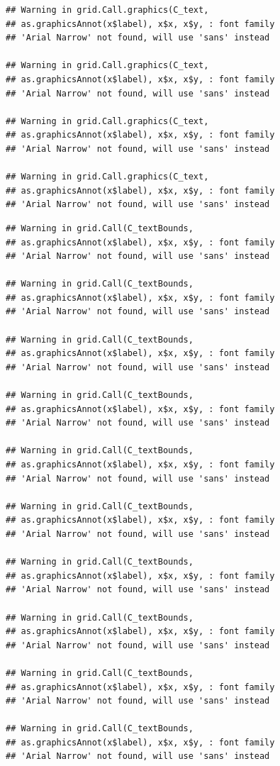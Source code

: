 \documentclass[]{krantz}
\begin{document}
\begin{verbatim}
## Warning in grid.Call.graphics(C_text,
## as.graphicsAnnot(x$label), x$x, x$y, : font family
## 'Arial Narrow' not found, will use 'sans' instead

## Warning in grid.Call.graphics(C_text,
## as.graphicsAnnot(x$label), x$x, x$y, : font family
## 'Arial Narrow' not found, will use 'sans' instead

## Warning in grid.Call.graphics(C_text,
## as.graphicsAnnot(x$label), x$x, x$y, : font family
## 'Arial Narrow' not found, will use 'sans' instead

## Warning in grid.Call.graphics(C_text,
## as.graphicsAnnot(x$label), x$x, x$y, : font family
## 'Arial Narrow' not found, will use 'sans' instead
\end{verbatim}

\begin{verbatim}
## Warning in grid.Call(C_textBounds,
## as.graphicsAnnot(x$label), x$x, x$y, : font family
## 'Arial Narrow' not found, will use 'sans' instead

## Warning in grid.Call(C_textBounds,
## as.graphicsAnnot(x$label), x$x, x$y, : font family
## 'Arial Narrow' not found, will use 'sans' instead

## Warning in grid.Call(C_textBounds,
## as.graphicsAnnot(x$label), x$x, x$y, : font family
## 'Arial Narrow' not found, will use 'sans' instead

## Warning in grid.Call(C_textBounds,
## as.graphicsAnnot(x$label), x$x, x$y, : font family
## 'Arial Narrow' not found, will use 'sans' instead

## Warning in grid.Call(C_textBounds,
## as.graphicsAnnot(x$label), x$x, x$y, : font family
## 'Arial Narrow' not found, will use 'sans' instead

## Warning in grid.Call(C_textBounds,
## as.graphicsAnnot(x$label), x$x, x$y, : font family
## 'Arial Narrow' not found, will use 'sans' instead

## Warning in grid.Call(C_textBounds,
## as.graphicsAnnot(x$label), x$x, x$y, : font family
## 'Arial Narrow' not found, will use 'sans' instead

## Warning in grid.Call(C_textBounds,
## as.graphicsAnnot(x$label), x$x, x$y, : font family
## 'Arial Narrow' not found, will use 'sans' instead

## Warning in grid.Call(C_textBounds,
## as.graphicsAnnot(x$label), x$x, x$y, : font family
## 'Arial Narrow' not found, will use 'sans' instead

## Warning in grid.Call(C_textBounds,
## as.graphicsAnnot(x$label), x$x, x$y, : font family
## 'Arial Narrow' not found, will use 'sans' instead


\end{verbatim}
\end{document}
